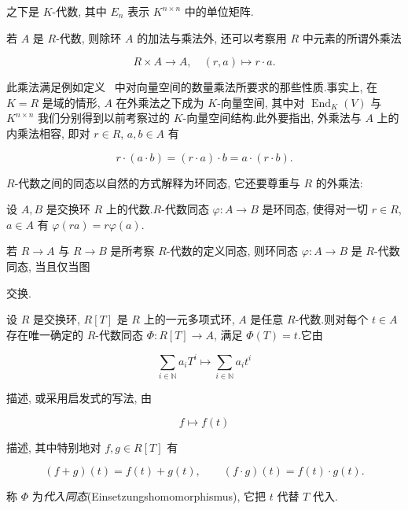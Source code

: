 之下是 $K$-代数, 其中 $E_n$ 表示 $K^{n \times n}$ 中的单位矩阵.

若 $A$ 是 $R$-代数, 则除环 $A$ 的加法与乘法外, 还可以考察用 $R$ 中元素的所谓外乘法

\[
R \times A \longrightarrow A, \quad (r, a) \longmapsto r \cdot a\text{.}
\]

此乘法满足例如定义~ 中对向量空间的数量乘法所要求的那些性质.事实上, 在 $K = R$ 是域的情形, $A$ 在外乘法之下成为 $K$-向量空间, 其中对 $\operatorname{End}_K(V)$ 与 $K^{n \times n}$ 我们分别得到以前考察过的 $K$-向量空间结构.此外要指出, 外乘法与 $A$ 上的内乘法相容, 即对 $r \in R$, $a, b \in A$ 有

\[
r \cdot (a \cdot b) = (r \cdot a) \cdot b = a \cdot (r \cdot b)\text{.}
\]

$R$-代数之间的同态以自然的方式解释为环同态, 它还要尊重与 $R$ 的外乘法:

\begin{definition}[$R$-代数同态]\label{def:5.1.6}
设 $A, B$ 是交换环 $R$ 上的代数.$R$-代数同态 $\varphi \colon A \longrightarrow B$ 是环同态, 使得对一切 $r \in R$, $a \in A$ 有 $\varphi(ra) = r\varphi(a)$.
\end{definition}

若 $R \longrightarrow A$ 与 $R \longrightarrow B$ 是所考察 $R$-代数的定义同态, 则环同态 $\varphi \colon A \longrightarrow B$ 是 $R$-代数同态, 当且仅当图

\begin{center}
\end{center}

交换.

\begin{theorem}\label{thm:5.1.7}
设 $R$ 是交换环, $R[T]$ 是 $R$ 上的一元多项式环, $A$ 是任意 $R$-代数.则对每个 $t \in A$ 存在唯一确定的 $R$-代数同态 $\varPhi \colon R[T] \longrightarrow A$, 满足 $\varPhi(T) = t$.它由

\[
\sum_{i \in \mathbb{N}} a_i T^i \longmapsto \sum_{i \in \mathbb{N}} a_i t^i
\]

描述, 或采用启发式的写法, 由

\[
f \longmapsto f(t)
\]

描述, 其中特别地对 $f, g \in R[T]$ 有

\[
(f + g)(t) = f(t) + g(t), \qquad (f \cdot g)(t) = f(t) \cdot g(t)\text{.}
\]

称 $\varPhi$ 为\emph{代入同态}(\textup{Einsetzungshomomorphismus}), 它把 $t$ 代替 $T$ 代入.
\end{theorem}


